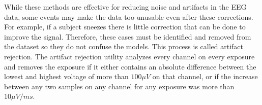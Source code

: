 While these methods are effective for reducing noise and artifacts in the EEG 
data, some events may make the data too unusable even after these corrections. 
For example, if a subject sneezes there is little correction that can be done 
to improve the signal. Therefore, these cases must be identified and removed 
from the dataset so they do not confuse the models. This process is called 
artifact rejection. The artifact rejection utility analyzes every channel on 
every exposure and removes the exposure if it either contains an absolute 
difference between the lowest and highest voltage of more than $100{\mu}V$ on 
that channel, or if the increase between any two samples on any channel for any 
exposure was more than $10{\mu}V/ms$. 
